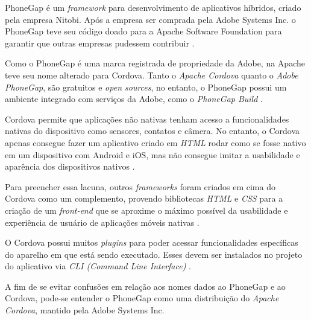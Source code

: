 PhoneGap é um \textit{framework} para desenvolvimento de aplicativos híbridos, criado pela empresa Nitobi. 
Após a empresa ser comprada pela Adobe Systems Inc. o PhoneGap teve seu código doado para a Apache Software Foundation 
para garantir que outras empresas pudessem contribuir \cite{bezerra_desenvolvimento_2016}.%


Como o PhoneGap é uma marca registrada de propriedade da Adobe, na Apache teve seu nome alterado para Cordova.
Tanto o \textit{Apache Cordova} quanto o \textit{Adobe PhoneGap}, são gratuitos e \textit{open sources}, no entanto, o 
PhoneGap possui um ambiente integrado com serviços da Adobe, como o \textit{PhoneGap Build} \cite{bezerra_desenvolvimento_2016}.
 
Cordova permite que aplicações não nativas tenham acesso a funcionalidades nativas do dispositivo como sensores, 
contatos e câmera. No entanto, o Cordova apenas consegue fazer um aplicativo criado em 
\textit{HTML} rodar como se fosse nativo em um dispositivo com Android e iOS, mas não consegue 
imitar a usabilidade e aparência dos dispositivos nativos \cite{bezerra_desenvolvimento_2016}. 

Para preencher essa lacuna, outros \textit{frameworks} foram criados em cima do Cordova como um complemento, 
provendo bibliotecas \textit{HTML} e \textit{CSS} para a 
criação de um \textit{front-end} que se aproxime o máximo possível da usabilidade e experiência de usuário de 
aplicações móveis nativas \cite{bezerra_desenvolvimento_2016}.

O Cordova possui muitos \textit{plugins} para poder acessar funcionalidades específicas do aparelho em que está sendo 
executado. Esses devem ser instalados no projeto do aplicativo via \textit{CLI (Command Line Interface)} \cite{bezerra_desenvolvimento_2016}. 

A fim de se evitar confusões em relação aos nomes dados ao PhoneGap e ao Cordova, pode-se entender o PhoneGap 
como uma distribuição do \textit{Apache Cordova}, mantido pela Adobe Systems Inc. 



